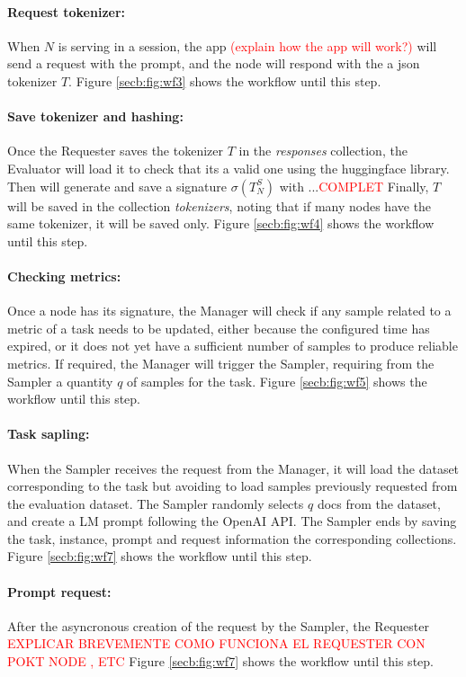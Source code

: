 \paragraph{Request tokenizer:}
When $N$ is serving in a session, the app \textcolor{red}{(explain how the app will work?)} will send a request with the prompt, and the node will respond with the a json tokenizer $T$. 
Figure \ref{secb:fig:wf3} shows the workflow until this step.


\paragraph{Save tokenizer and hashing:}
Once the Requester saves the tokenizer $T$ in the \textit{responses} collection, the Evaluator will load it to check that its a valid one using the huggingface library. 
Then will generate and save a signature $\sigma(T_{N}^{S})$ with ...\textcolor{red}{COMPLET}
Finally, $T$ will be saved in the collection \textit{tokenizers}, noting that if many nodes have the same tokenizer, it will be saved only. 
Figure \ref{secb:fig:wf4} shows the workflow until this step.


\paragraph{Checking metrics:}
Once a node has its signature, the Manager will check if any sample related to a metric of a task needs to be updated, either because the configured time has expired, or it does not yet have a sufficient number of samples to produce reliable metrics. 
If required, the Manager will trigger the Sampler, requiring from the Sampler a quantity $q$ of samples for the task. 
Figure \ref{secb:fig:wf5} shows the workflow until this step.


\paragraph{Task sapling:}
When the Sampler receives the request from the Manager, it will load the dataset corresponding to the task but avoiding to load samples previously requested from the evaluation dataset. 
The Sampler randomly selects $q$ docs from the dataset, and create a \gls{LM} prompt following the OpenAI API. The Sampler ends by saving the task, instance, prompt and request information the corresponding collections.
Figure \ref{secb:fig:wf7} shows the workflow until this step.

\paragraph{Prompt request:}
After the asyncronous creation of the request by the Sampler, the Requester \textcolor{red}{EXPLICAR BREVEMENTE COMO FUNCIONA EL REQUESTER CON POKT NODE , ETC}
Figure \ref{secb:fig:wf7} shows the workflow until this step.


